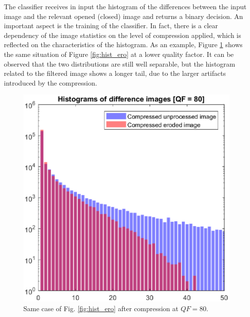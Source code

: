 \documentclass{ieeeaccess}
\begin{document}
The classifier receives in input the histogram of the differences between the input image and the relevant opened (closed) image and returns a binary decision. An important aspect is the training of the classifier. In fact, there is a clear dependency of the image statistics on the level of compression applied, which is reflected on the characteristics of the histogram. As an example, Figure \ref{fig:hist_ero_80} shows the same situation of Figure \ref{fig:hist_ero} at a lower quality factor. It can be observed that the two distributions are still well separable, but the histogram related to the filtered image shows a longer tail, due to the larger artifacts introduced by the compression.

\begin{figure}[t!]%
	\centering
	\includegraphics[width=\linewidth]{hist_ero_80.eps}
	\caption{Same case of Fig. \ref{fig:hist_ero} after compression at $QF = 80$.}
	\label{fig:hist_ero_80}%
\end{figure}
\end{document}
